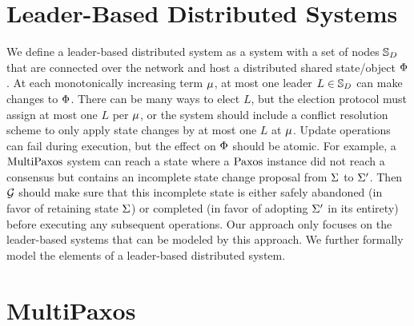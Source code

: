\section{Leader-Based Distributed Systems}
\label{chapter:witnesspassing:sec:leader-based-distributed-systems}


We define a leader-based distributed system as a system with a set of nodes
$\mathbb{S}_{D}$ that are connected over the network and host a distributed shared state/object
$\Phi$. At each monotonically increasing term $\mu$, at most one leader
$L \in \mathbb{S}_{D}$ can make changes to $\Phi$. There can be many ways to elect
$L$, but the election protocol must assign at most one $L$ per $\mu$,
or the system should include a conflict resolution scheme to only apply
state changes by at most one $L$ at $\mu$.
Update operations can fail during execution, but the effect on $\Phi$ should be atomic. 
For example, a $\mathrm{MultiPaxos}$ system can reach a
state where a $\mathrm{Paxos}$ instance did not reach a consensus but contains an
incomplete state change proposal from $\Sigma$ to $\Sigma^\prime$.
Then $\mathcal{G}$ should make sure that this incomplete state is either safely abandoned (in favor of retaining state $\Sigma$)
or completed (in favor of adopting $\Sigma^\prime$ in its entirety)
before executing any subsequent operations. 
Our approach only focuses on the leader-based systems that can be modeled by this approach.
We further formally model the elements of a leader-based distributed system.


\section{MultiPaxos}
\label{chapter:witnesspassing:multipaxos}

